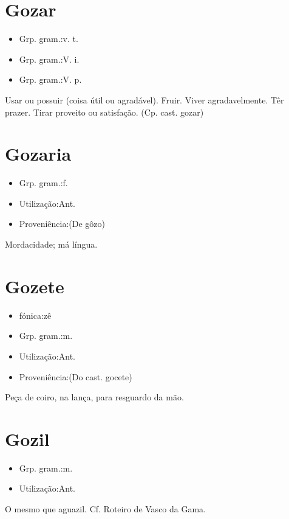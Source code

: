 \section{Gozar}
\begin{itemize}
\item {Grp. gram.:v. t.}
\end{itemize}
\begin{itemize}
\item {Grp. gram.:V. i.}
\end{itemize}
\begin{itemize}
\item {Grp. gram.:V. p.}
\end{itemize}
Usar ou possuir (coisa útil ou agradável).
Fruir.
Viver agradavelmente.
Têr prazer.
Tirar proveito ou satisfação.
(Cp. cast. \textunderscore gozar\textunderscore )
\section{Gozaria}
\begin{itemize}
\item {Grp. gram.:f.}
\end{itemize}
\begin{itemize}
\item {Utilização:Ant.}
\end{itemize}
\begin{itemize}
\item {Proveniência:(De \textunderscore gôzo\textunderscore )}
\end{itemize}
Mordacidade; má língua.
\section{Gozete}
\begin{itemize}
\item {fónica:zê}
\end{itemize}
\begin{itemize}
\item {Grp. gram.:m.}
\end{itemize}
\begin{itemize}
\item {Utilização:Ant.}
\end{itemize}
\begin{itemize}
\item {Proveniência:(Do cast. \textunderscore gocete\textunderscore )}
\end{itemize}
Peça de coiro, na lança, para resguardo da mão.
\section{Gozil}
\begin{itemize}
\item {Grp. gram.:m.}
\end{itemize}
\begin{itemize}
\item {Utilização:Ant.}
\end{itemize}
O mesmo que \textunderscore aguazil\textunderscore . Cf. \textunderscore Roteiro de Vasco da Gama\textunderscore .
